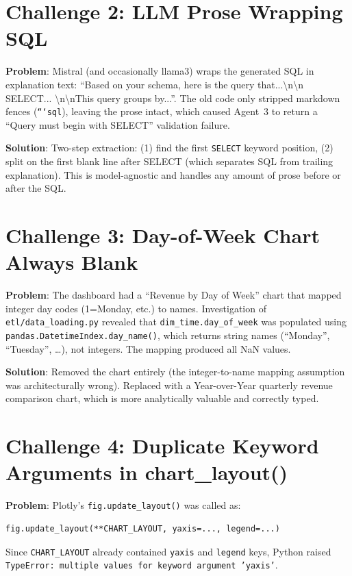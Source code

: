 \documentclass[12pt,a4paper]{report}
\begin{document}
\section{Challenge 2: LLM Prose Wrapping SQL}

\textbf{Problem}: Mistral (and occasionally llama3) wraps the generated SQL in explanation
text: ``Based on your schema, here is the query that...\textbackslash n\textbackslash n
SELECT... \textbackslash n\textbackslash nThis query groups by...''. The old code only
stripped markdown fences (\texttt{```sql}), leaving the prose intact, which caused Agent~3
to return a ``Query must begin with SELECT'' validation failure.

\textbf{Solution}: Two-step extraction: (1) find the first \texttt{SELECT} keyword position,
(2) split on the first blank line after SELECT (which separates SQL from trailing explanation).
This is model-agnostic and handles any amount of prose before or after the SQL.

\section{Challenge 3: Day-of-Week Chart Always Blank}

\textbf{Problem}: The dashboard had a ``Revenue by Day of Week'' chart that mapped integer
day codes (1=Monday, etc.) to names. Investigation of \texttt{etl/data\_loading.py} revealed
that \texttt{dim\_time.day\_of\_week} was populated using \texttt{pandas.DatetimeIndex.day\_name()},
which returns string names (``Monday'', ``Tuesday'', \ldots), not integers. The mapping produced
all NaN values.

\textbf{Solution}: Removed the chart entirely (the integer-to-name mapping assumption was
architecturally wrong). Replaced with a Year-over-Year quarterly revenue comparison chart,
which is more analytically valuable and correctly typed.

\section{Challenge 4: Duplicate Keyword Arguments in chart\_layout()}

\textbf{Problem}: Plotly's \texttt{fig.update\_layout()} was called as:
\begin{lstlisting}
fig.update_layout(**CHART_LAYOUT, yaxis=..., legend=...)
\end{lstlisting}
Since \texttt{CHART\_LAYOUT} already contained \texttt{yaxis} and \texttt{legend} keys,
Python raised \texttt{TypeError: multiple values for keyword argument 'yaxis'}.
\end{document}
